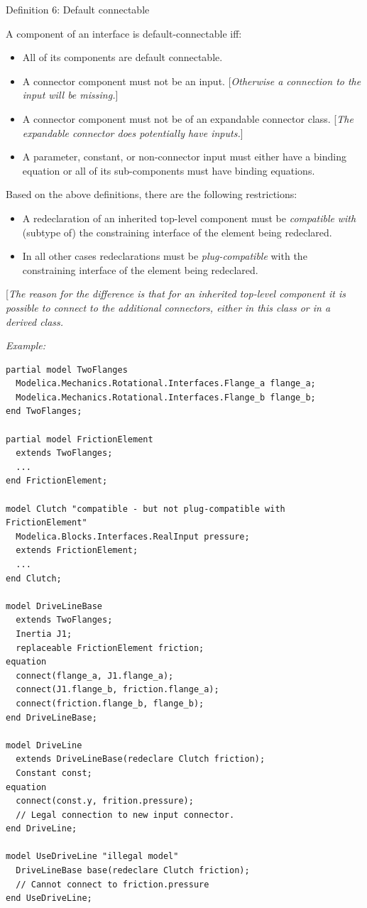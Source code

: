 \documentclass[10pt,a4paper]{report}
\begin{document}
Definition 6: Default connectable

A component of an interface is default-connectable iff:

\begin{itemize}
\item
  All of its components are default connectable.
\item
  A connector component must not be an input. {[}\emph{Otherwise a
  connection to the input will be missing.}{]}
\item
  A connector component must not be of an expandable connector class.
  {[}\emph{The expandable connector does potentially have inputs.}{]}
\item
  A parameter, constant, or non-connector input must either have a
  binding equation or all of its sub-components must have binding
  equations.
\end{itemize}

Based on the above definitions, there are the following restrictions:

\begin{itemize}
\item
  A redeclaration of an inherited top-level component must be
  \emph{compatible} \emph{with} (subtype of) the constraining interface
  of the element being redeclared.
\item
  In all other cases redeclarations must be \emph{plug-compatible} with
  the constraining interface of the element being redeclared.
\end{itemize}

{[}\emph{The reason for the difference is that for an inherited
top-level component it is possible to connect to the additional
connectors, either in this class or in a derived class.}

\emph{Example:}
\begin{lstlisting}[language=modelica]
partial model TwoFlanges
  Modelica.Mechanics.Rotational.Interfaces.Flange_a flange_a;
  Modelica.Mechanics.Rotational.Interfaces.Flange_b flange_b;
end TwoFlanges;

partial model FrictionElement
  extends TwoFlanges;
  ...
end FrictionElement;

model Clutch "compatible - but not plug-compatible with FrictionElement"
  Modelica.Blocks.Interfaces.RealInput pressure;
  extends FrictionElement;
  ...
end Clutch;

model DriveLineBase
  extends TwoFlanges;
  Inertia J1;
  replaceable FrictionElement friction;
equation 
  connect(flange_a, J1.flange_a);
  connect(J1.flange_b, friction.flange_a);
  connect(friction.flange_b, flange_b);
end DriveLineBase;

model DriveLine
  extends DriveLineBase(redeclare Clutch friction);
  Constant const;
equation 
  connect(const.y, frition.pressure);
  // Legal connection to new input connector.
end DriveLine;

model UseDriveLine "illegal model"
  DriveLineBase base(redeclare Clutch friction);
  // Cannot connect to friction.pressure
end UseDriveLine;
\end{lstlisting}
\end{document}
